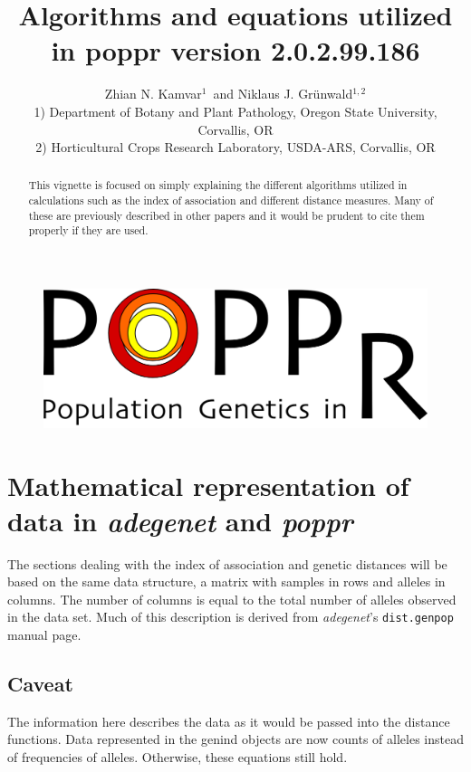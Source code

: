 \documentclass[letterpaper]{article}\usepackage[]{graphicx}\usepackage[]{color}
\title{Algorithms and equations utilized in poppr version 2.0.2.99.186}
\author{Zhian N. Kamvar$^{1}$\ and Niklaus J. Gr\"unwald$^{1,2}$\\\scriptsize{1)
Department of Botany and Plant Pathology, Oregon State University, Corvallis,
OR}\\\scriptsize{2) Horticultural Crops Research Laboratory, USDA-ARS,
Corvallis, OR}}
\newcommand{\poppr}{\textit{poppr}}
\newcommand{\adegenet}{\textit{adegenet}}
\begin{document}
\maketitle

\begin{abstract}
This vignette is focused on simply explaining the different algorithms utilized
in calculations such as the index of association and different distance measures.
Many of these are previously described in other papers and it would be prudent
to cite them properly if they are used.
\end{abstract}

\begin{figure}[b]   
  \centering
  \label{logo}   
  \includegraphics{popprlogo} 
\end{figure} 

\newpage 
\begingroup
  \hypersetup{linkcolor=black} 
  \tableofcontents 
\endgroup 

\section{Mathematical representation of data in \adegenet{} and \poppr{}}

The sections dealing with the index of association and genetic distances will be
based on the same data structure, a matrix with samples in rows and alleles in
columns. The number of columns is equal to the total number of alleles observed
in the data set. Much of this description is derived from \adegenet{}'s
\texttt{dist.genpop} manual page.

\subsection{Caveat}

The information here describes the data as it would be passed into the distance
functions. Data represented in the genind objects are now counts of alleles
instead of frequencies of alleles. Otherwise, these equations still hold. 
\end{document}
